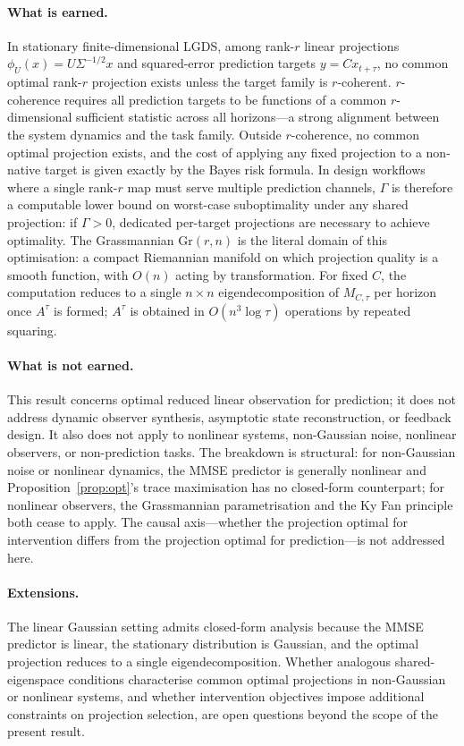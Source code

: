 \documentclass[final,3p,times]{elsarticle}
\newcommand{\Gr}{\mathrm{Gr}}
\begin{document}
\paragraph{What is earned.}
In stationary finite-dimensional LGDS, among rank-$r$ linear projections
$\phi_U(x)=U\Sigma^{-1/2}x$ and squared-error prediction targets
$y=Cx_{t+\tau}$, no common optimal rank-$r$ projection exists unless the
target family is $r$-coherent.
$r$-coherence requires all prediction targets to be functions of a common
$r$-dimensional sufficient statistic across all horizons---a strong alignment
between the system dynamics and the task family.
Outside $r$-coherence, no common optimal projection exists, and the cost of
applying any fixed projection to a non-native target is given exactly by the
Bayes risk formula.
In design workflows where a single rank-$r$ map must serve multiple
prediction channels, $\Gamma$ is therefore a computable lower bound on
worst-case suboptimality under any shared projection: if $\Gamma>0$, dedicated
per-target projections are necessary to achieve optimality.
The Grassmannian $\Gr(r,n)$ is the literal domain of this optimisation:
a compact Riemannian manifold on which projection quality is a smooth function,
with $O(n)$ acting by transformation.
For fixed $C$, the computation reduces to a single $n \times n$
eigendecomposition of $M_{C,\tau}$ per horizon once $A^\tau$ is formed;
$A^\tau$ is obtained in $O(n^3 \log \tau)$ operations by repeated squaring.

\paragraph{What is not earned.}
This result concerns optimal reduced linear observation for prediction; it
does not address dynamic observer synthesis, asymptotic state reconstruction,
or feedback design.
It also does not apply to nonlinear systems, non-Gaussian noise,
nonlinear observers, or non-prediction tasks.
The breakdown is structural: for non-Gaussian noise or nonlinear dynamics,
the MMSE predictor is generally nonlinear and
Proposition~\ref{prop:opt}'s trace maximisation has no closed-form counterpart;
for nonlinear observers, the Grassmannian parametrisation and the Ky Fan
principle both cease to apply.
The causal axis---whether the projection optimal for intervention differs from
the projection optimal for prediction---is not addressed here.

\paragraph{Extensions.}
The linear Gaussian setting admits closed-form analysis because the MMSE
predictor is linear, the stationary distribution is Gaussian, and the
optimal projection reduces to a single eigendecomposition.
Whether analogous shared-eigenspace conditions characterise common optimal
projections in non-Gaussian or nonlinear systems, and whether intervention
objectives impose additional constraints on projection selection, are open
questions beyond the scope of the present result.
\end{document}
